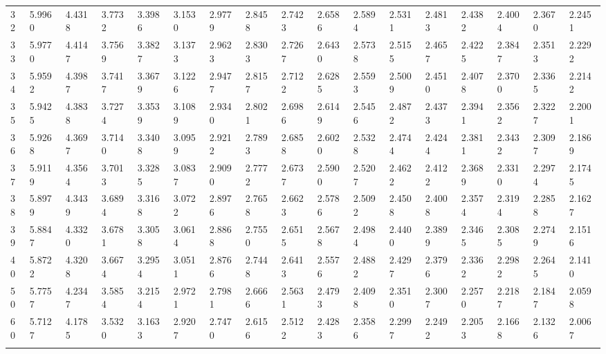 {\begin{tabular}{|m{8pt}|m{18pt}*{15}{m{18pt}}}
 32 & 5.9960 & 4.4318 & 3.7732 & 3.3986 & 3.1530 & 2.9779 & 2.8458 & 2.7423 & 2.6586 & 2.5894 & 2.5311 & 2.4813 & 2.4382 & 2.4004 & 2.3670 & 2.2451 \\[2pt] \arrayrulecolor{light-gray}\hline\arrayrulecolor{black}  
 33 & 5.9770 & 4.4147 & 3.7569 & 3.3827 & 3.1373 & 2.9623 & 2.8303 & 2.7267 & 2.6430 & 2.5738 & 2.5155 & 2.4657 & 2.4225 & 2.3847 & 2.3513 & 2.2292 \\[2pt] \arrayrulecolor{light-gray}\hline\arrayrulecolor{black}  
 34 & 5.9592 & 4.3987 & 3.7417 & 3.3679 & 3.1226 & 2.9477 & 2.8157 & 2.7122 & 2.6285 & 2.5593 & 2.5009 & 2.4510 & 2.4078 & 2.3700 & 2.3365 & 2.2142 \\[2pt] \arrayrulecolor{light-gray}\hline\arrayrulecolor{black}  
 35 & 5.9425 & 4.3838 & 3.7274 & 3.3539 & 3.1089 & 2.9340 & 2.8021 & 2.6986 & 2.6149 & 2.5456 & 2.4872 & 2.4373 & 2.3941 & 2.3562 & 2.3227 & 2.2001 \\[2pt] \arrayrulecolor{light-gray}\hline\arrayrulecolor{black}  
 36 & 5.9268 & 4.3697 & 3.7140 & 3.3408 & 3.0959 & 2.9212 & 2.7893 & 2.6858 & 2.6020 & 2.5328 & 2.4744 & 2.4244 & 2.3811 & 2.3432 & 2.3097 & 2.1869 \\[2pt] \arrayrulecolor{light-gray}\hline\arrayrulecolor{black}  
 37 & 5.9119 & 4.3564 & 3.7013 & 3.3285 & 3.0837 & 2.9090 & 2.7772 & 2.6737 & 2.5900 & 2.5207 & 2.4622 & 2.4122 & 2.3689 & 2.3310 & 2.2974 & 2.1745 \\[2pt] \arrayrulecolor{light-gray}\hline\arrayrulecolor{black}  
 38 & 5.8979 & 4.3439 & 3.6894 & 3.3168 & 3.0722 & 2.8976 & 2.7658 & 2.6623 & 2.5786 & 2.5092 & 2.4508 & 2.4008 & 2.3574 & 2.3194 & 2.2858 & 2.1627 \\[2pt] \arrayrulecolor{light-gray}\hline\arrayrulecolor{black}  
 39 & 5.8847 & 4.3320 & 3.6781 & 3.3058 & 3.0614 & 2.8868 & 2.7550 & 2.6515 & 2.5678 & 2.4984 & 2.4400 & 2.3899 & 2.3465 & 2.3085 & 2.2749 & 2.1516 \\[2pt] \arrayrulecolor{light-gray}\hline\arrayrulecolor{black}  
 40 & 5.8722 & 4.3208 & 3.6674 & 3.2954 & 3.0511 & 2.8766 & 2.7448 & 2.6413 & 2.5576 & 2.4882 & 2.4297 & 2.3796 & 2.3362 & 2.2982 & 2.2645 & 2.1410 \\[2pt] \arrayrulecolor{light-gray}\hline\arrayrulecolor{black}  
 50 & 5.7757 & 4.2347 & 3.5854 & 3.2154 & 2.9721 & 2.7981 & 2.6666 & 2.5631 & 2.4793 & 2.4098 & 2.3510 & 2.3007 & 2.2570 & 2.2187 & 2.1847 & 2.0598 \\[2pt] \arrayrulecolor{light-gray}\hline\arrayrulecolor{black}  
 60 & 5.7127 & 4.1785 & 3.5320 & 3.1633 & 2.9207 & 2.7470 & 2.6156 & 2.5122 & 2.4283 & 2.3586 & 2.2997 & 2.2492 & 2.2053 & 2.1668 & 2.1326 & 2.0067 \\[2pt] \arrayrulecolor{light-gray}\hline\arrayrulecolor{black}  

\end{tabular}}
